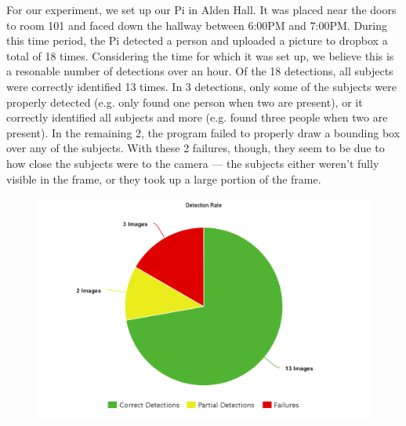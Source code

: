 For our experiment, we set up our Pi in Alden Hall.  It was placed near the doors to room 101 and faced down the hallway between 6:00PM and 7:00PM.  During this time period, the Pi detected a person and uploaded a picture to dropbox a total of 18 times.  Considering the time for which it was set up, we believe this is a resonable number of detections over an hour.  Of the 18 detections, all subjects were correctly identified 13 times.  In 3 detections, only some of the subjects were properly detected (e.g. only found one person when two are present), or it correctly identified all subjects and more (e.g. found three people when two are present).  In the remaining 2, the program failed to properly draw a bounding box over any of the subjects.  With these 2 failures, though, they seem to be due to how close the subjects were to the camera --- the subjects either weren't fully visible in the frame, or they took up a large portion of the frame.

\begin{figure}[h]
\centering
\includegraphics[scale=.25]{images/DetectionRate.png}
\end{figure}

